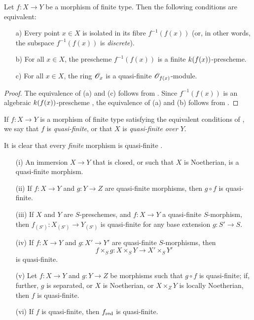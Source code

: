 \begin{corollary}[6.2.2]
\label{II.6.2.2}
Let $f:X\to Y$ be a morphism of finite type.
Then the following conditions are equivalent:
\begin{enumerate}
  \item[a)] Every point $x\in X$ is isolated in its fibre $f^{-1}(f(x))$ (or, in other words, the subspace $f^{-1}(f(x))$ is \emph{discrete}).
  \item[b)] For all $x\in X$, the prescheme $f^{-1}(f(x))$ is a finite $k(f(x))$-prescheme.
  \item[c)] For all $x\in X$, the ring $\mathscr{O}_x$ is a quasi-finite $\mathscr{O}_{f(x)}$-module.
\end{enumerate}
\end{corollary}

\begin{proof}
The equivalence of (a) and (c) follows from .
Since $f^{-1}(f(x))$ is an algebraic $k(f(x))$-prescheme , the equivalence of (a) and (b) follows from .
\end{proof}

\begin{definition}[6.2.3]
\label{II.6.2.3}
If $f:X\to Y$ is a morphism of finite type satisfying the equivalent conditions of , we say that $f$ is \emph{quasi-finite}, or that $X$ is \emph{quasi-finite over $Y$}.
\end{definition}

It is clear that every \emph{finite} morphism is quasi-finite .

\begin{proposition}[6.2.4]
\label{II.6.2.4}
\medskip\noindent
\begin{enumerate}
  \item[(i)] An immersion $X\to Y$ that is closed, or such that $X$ is Noetherian, is a quasi-finite morphism.
  \item[(ii)] If $f:X\to Y$ and $g:Y\to Z$ are quasi-finite morphisms, then $g\circ f$ is quasi-finite.
  \item[(iii)] If $X$ and $Y$ are $S$-preschemes, and $f:X\to Y$ a quasi-finite $S$-morphism, then $f_{(S')}:X_{(S')}\to Y_{(S')}$ is quasi-finite for any base extension $g:S'\to S$.
  \item[(iv)] If $f:X\to Y$ and $g:X'\to Y'$ are quasi-finite $S$-morphisms, then
    \[
      f\times_S g : X\times_S Y \to X'\times_S Y'
    \]
    is quasi-finite.
  \item[(v)] Let $f:X\to Y$ and $g:Y\to Z$ be morphisms such that $g\circ f$ is quasi-finite; if, further, $g$ is separated, or $X$ is Noetherian, or $X\times_Z Y$ is locally Noetherian, then $f$ is quasi-finite.
  \item[(vi)] If $f$ is quasi-finite, then $f_{\mathrm{red}}$ is quasi-finite.
\end{enumerate}
\end{proposition}

